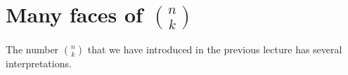 \section{Many faces of $\binom{n}{k}$}
The number $\binom{n}{k}$ that we have introduced in the previous lecture has several interpretations.